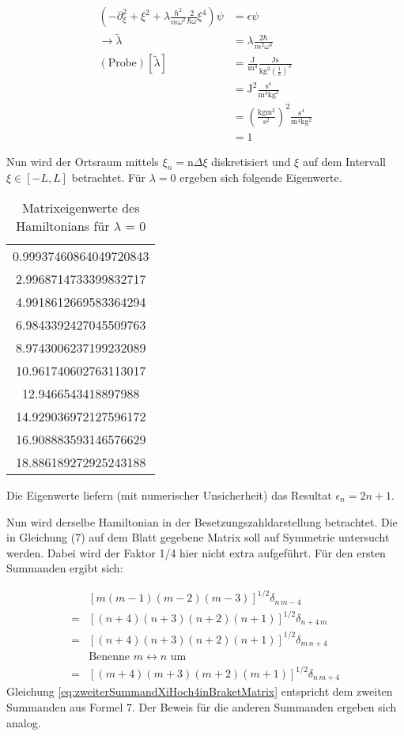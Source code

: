\begin{align}
	\left( - \partial_{\xi}^2+\xi^2+\lambda \frac{\hbar^2}{m\omega^2}\frac{2}{\hbar \omega} \xi^4 \right) \psi &= \epsilon \psi \\
	\rightarrow \tilde{\lambda} &= \lambda \frac{ 2 \hbar }{m^2 \omega^3} \\
	\left(\text{Probe}\right)[\tilde{\lambda}] &= \frac{\mathup{J}}{\mathup{m^4}} \frac{\mathup{Js}}{\mathup{kg^2} \left(\frac{1}{\mathup{s}}\right)^3} \\
	&= \mathup{J^2} \frac{\mathup{s^4}}{\mathup{m^4kg^2}} \\
	&= \left( \frac{\mathup{kg m^2}}{\mathup{s^2}}\right)^2 \frac{\mathup{s^4}}{\mathup{m^4kg^2}}\\
	&= 1
\end{align}

Nun wird der Ortsraum mittels $\xi_n = \mathup{n} \Delta \xi$ diskretisiert und $\xi$ auf dem Intervall $\xi \in [-L,L]$ betrachtet. Für $\lambda = 0$ ergeben sich folgende Eigenwerte.
\begin{table}[]
\centering
\caption{Matrixeigenwerte des Hamiltonians für $\lambda$ = 0}
\label{table:2b0eigenvalues}
\begin{tabular}{c}
0.99937460864049720843 \\
2.9968714733399832717 \\
4.9918612669583364294 \\
6.9843392427045509763 \\
8.9743006237199232089 \\
10.961740602763113017 \\
12.9466543418897988 \\
14.929036972127596172 \\
16.908883593146576629 \\
18.886189272925243188 \\
\end{tabular}
\end{table}
Die Eigenwerte liefern (mit numerischer Unsicherheit) das Resultat $\epsilon_n = 2n+1$.

Nun wird derselbe Hamiltonian in der Besetzungszahldarstellung betrachtet.
Die in Gleichung (7) auf dem Blatt gegebene Matrix soll auf Symmetrie untersucht werden. Dabei wird der Faktor 1/4 hier nicht extra aufgeführt. Für den ersten Summanden ergibt sich:

\begin{align}
& \left[m(m-1)(m-2)(m-3)\right]^{1/2} \delta_{n\,m-4} \\
= &\left[(n+4)(n+3)(n+2)(n+1)\right]^{1/2} \delta_{n+4\,m}\\
= &\left[(n+4)(n+3)(n+2)(n+1)\right]^{1/2} \delta_{m\,n+4}\\
&\text{Benenne } m\leftrightarrow n \text{ um}\\
= & \left[(m+4)(m+3)(m+2)(m+1)\right]^{1/2} \delta_{n\,m+4} \label{eq:zweiterSummandXiHoch4inBraketMatrix}
\end{align}
Gleichung \ref{eq:zweiterSummandXiHoch4inBraketMatrix} entspricht dem zweiten Summanden aus Formel 7. Der Beweis für die anderen Summanden ergeben sich analog.

